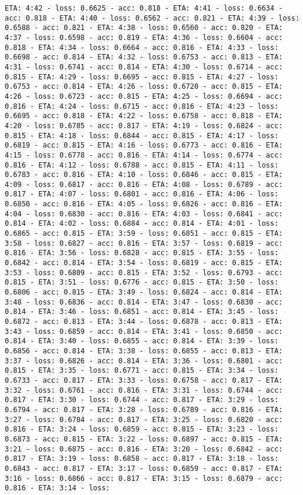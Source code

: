 \documentclass[11pt]{article}
\begin{document}
\begin{Verbatim}[commandchars=\\\{\}]
ETA: 4:42 - loss: 0.6625 - acc: 0.818 - ETA: 4:41 - loss: 0.6634 - acc: 0.818 - ETA: 4:40 - loss: 0.6562 - acc: 0.821 - ETA: 4:39 - loss: 0.6588 - acc: 0.821 - ETA: 4:38 - loss: 0.6560 - acc: 0.820 - ETA: 4:37 - loss: 0.6598 - acc: 0.819 - ETA: 4:36 - loss: 0.6604 - acc: 0.818 - ETA: 4:34 - loss: 0.6664 - acc: 0.816 - ETA: 4:33 - loss: 0.6698 - acc: 0.814 - ETA: 4:32 - loss: 0.6753 - acc: 0.813 - ETA: 4:31 - loss: 0.6741 - acc: 0.814 - ETA: 4:30 - loss: 0.6714 - acc: 0.815 - ETA: 4:29 - loss: 0.6695 - acc: 0.815 - ETA: 4:27 - loss: 0.6753 - acc: 0.814 - ETA: 4:26 - loss: 0.6720 - acc: 0.815 - ETA: 4:26 - loss: 0.6723 - acc: 0.815 - ETA: 4:25 - loss: 0.6694 - acc: 0.816 - ETA: 4:24 - loss: 0.6715 - acc: 0.816 - ETA: 4:23 - loss: 0.6695 - acc: 0.818 - ETA: 4:22 - loss: 0.6758 - acc: 0.818 - ETA: 4:20 - loss: 0.6785 - acc: 0.817 - ETA: 4:19 - loss: 0.6824 - acc: 0.815 - ETA: 4:18 - loss: 0.6844 - acc: 0.815 - ETA: 4:17 - loss: 0.6819 - acc: 0.815 - ETA: 4:16 - loss: 0.6773 - acc: 0.816 - ETA: 4:15 - loss: 0.6778 - acc: 0.816 - ETA: 4:14 - loss: 0.6774 - acc: 0.816 - ETA: 4:12 - loss: 0.6788 - acc: 0.815 - ETA: 4:11 - loss: 0.6783 - acc: 0.816 - ETA: 4:10 - loss: 0.6846 - acc: 0.815 - ETA: 4:09 - loss: 0.6817 - acc: 0.816 - ETA: 4:08 - loss: 0.6789 - acc: 0.817 - ETA: 4:07 - loss: 0.6801 - acc: 0.816 - ETA: 4:06 - loss: 0.6850 - acc: 0.816 - ETA: 4:05 - loss: 0.6826 - acc: 0.816 - ETA: 4:04 - loss: 0.6830 - acc: 0.816 - ETA: 4:03 - loss: 0.6841 - acc: 0.814 - ETA: 4:02 - loss: 0.6884 - acc: 0.814 - ETA: 4:01 - loss: 0.6865 - acc: 0.815 - ETA: 3:59 - loss: 0.6851 - acc: 0.815 - ETA: 3:58 - loss: 0.6827 - acc: 0.816 - ETA: 3:57 - loss: 0.6819 - acc: 0.816 - ETA: 3:56 - loss: 0.6828 - acc: 0.815 - ETA: 3:55 - loss: 0.6842 - acc: 0.814 - ETA: 3:54 - loss: 0.6819 - acc: 0.815 - ETA: 3:53 - loss: 0.6809 - acc: 0.815 - ETA: 3:52 - loss: 0.6793 - acc: 0.815 - ETA: 3:51 - loss: 0.6776 - acc: 0.815 - ETA: 3:50 - loss: 0.6806 - acc: 0.815 - ETA: 3:49 - loss: 0.6824 - acc: 0.814 - ETA: 3:48 - loss: 0.6836 - acc: 0.814 - ETA: 3:47 - loss: 0.6830 - acc: 0.814 - ETA: 3:46 - loss: 0.6851 - acc: 0.814 - ETA: 3:45 - loss: 0.6872 - acc: 0.813 - ETA: 3:44 - loss: 0.6878 - acc: 0.813 - ETA: 3:43 - loss: 0.6859 - acc: 0.814 - ETA: 3:41 - loss: 0.6850 - acc: 0.814 - ETA: 3:40 - loss: 0.6855 - acc: 0.814 - ETA: 3:39 - loss: 0.6856 - acc: 0.814 - ETA: 3:38 - loss: 0.6855 - acc: 0.813 - ETA: 3:37 - loss: 0.6826 - acc: 0.814 - ETA: 3:36 - loss: 0.6801 - acc: 0.815 - ETA: 3:35 - loss: 0.6771 - acc: 0.815 - ETA: 3:34 - loss: 0.6733 - acc: 0.817 - ETA: 3:33 - loss: 0.6758 - acc: 0.817 - ETA: 3:32 - loss: 0.6761 - acc: 0.816 - ETA: 3:31 - loss: 0.6744 - acc: 0.817 - ETA: 3:30 - loss: 0.6744 - acc: 0.817 - ETA: 3:29 - loss: 0.6794 - acc: 0.817 - ETA: 3:28 - loss: 0.6789 - acc: 0.816 - ETA: 3:27 - loss: 0.6784 - acc: 0.817 - ETA: 3:25 - loss: 0.6820 - acc: 0.816 - ETA: 3:24 - loss: 0.6859 - acc: 0.815 - ETA: 3:23 - loss: 0.6873 - acc: 0.815 - ETA: 3:22 - loss: 0.6897 - acc: 0.815 - ETA: 3:21 - loss: 0.6875 - acc: 0.816 - ETA: 3:20 - loss: 0.6842 - acc: 0.817 - ETA: 3:19 - loss: 0.6858 - acc: 0.817 - ETA: 3:18 - loss: 0.6843 - acc: 0.817 - ETA: 3:17 - loss: 0.6859 - acc: 0.817 - ETA: 3:16 - loss: 0.6866 - acc: 0.817 - ETA: 3:15 - loss: 0.6879 - acc: 0.816 - ETA: 3:14 - loss: 
\end{Verbatim}
\end{document}
